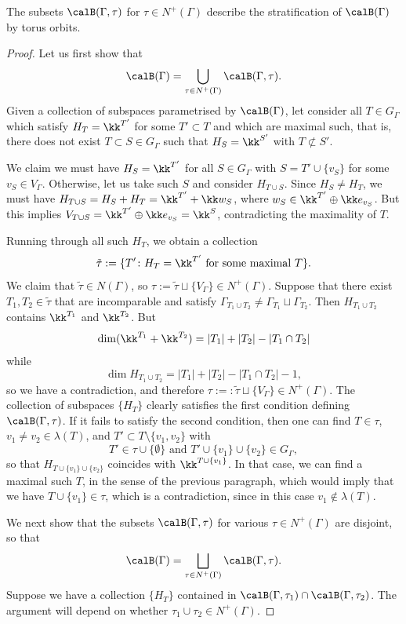 \begin{theorem}\label{th:orbits}
The subsets $\calB(\Gamma,\tau)$ for $\tau\in N^+(\Gamma)$ describe the stratification of $\calB(\Gamma)$ by torus orbits.
\end{theorem}

\begin{proof}
Let us first show that 
 \[
\calB(\Gamma)=\bigcup_{\tau\in N^+(\Gamma)} \calB(\Gamma,\tau).
 \]
Given a collection of subspaces parametrised by $\calB(\Gamma)$, let consider all $T\in G_\Gamma$ which satisfy $H_T=\kk^{T'}$ for some $T'\subset T$ and which are maximal such, that is, there does not exist $T\subset S\in G_\Gamma$ such that $H_S=\kk^{S'}$ with $T\not\subset S'$. 

We claim we must have $H_S=\kk^{T'}$ for all $S\in G_\Gamma$ with $S=T'\cup\{v_S\}$ for some $v_S\in V_\Gamma$. Otherwise, let us take such $S$ and consider $H_{T\cup S}$. Since $H_S\neq H_T$, we must have $H_{T\cup S}=H_S+H_T= \kk^{T'}+\kk w_S$, where $w_S\in \kk^{T'}\oplus \kk e_{v_S}$. But this implies $V_{T\cup S}=\kk^{T'}\oplus \kk e_{v_S}=\kk^{S}$, contradicting the maximality of $T$.

Running through all such $H_T$, we obtain a collection
 \[
\tilde\tau:=\{T'\colon H_T=\kk^{T'} \text{ for  some maximal } T\}.
 \]
We claim that $\tilde\tau\in N(\Gamma)$, so $\tau:=\tilde\tau\sqcup\{V_\Gamma\}\in N^+(\Gamma)$. Suppose that there exist $T_1,T_2\in\tilde\tau$ that are incomparable and satisfy $\Gamma_{T_1\cup T_2}\ne\Gamma_{T_1}\sqcup\Gamma_{T_2}$. Then $H_{T_1\cup T_2}$ contains $\kk^{T_1}$ and $\kk^{T_2}$. But 
 \[ 
\dim (\kk^{T_1}+\kk^{T_2}) = |T_1|+|T_2|-|T_1\cap T_2|
 \]
while
 \[
\dim H_{T_1\cup T_2} = |T_1|+|T_2|-|T_1\cap T_2|-1,
 \]
so we have a contradiction, and therefore $\tau:=:\tilde\tau\sqcup\{V_\Gamma\}\in N^+(\Gamma)$. The collection of subspaces $\{H_T\}$ clearly satisfies the first condition defining $\calB(\Gamma,\tau)$. If it fails to satisfy the second condition, then 
one can find $T\in\tau$, $v_1\ne v_2\in \lambda(T)$, and $T'\subset T\setminus\{v_1,v_2\}$ with 
 \[
T'\in \tau\cup\{\emptyset\}\text{  and } T'\cup\{v_1\}\cup\{v_2\}\in G_\Gamma,
 \] 
so that $H_{T\cup\{v_1\}\cup\{v_2\}}$ coincides with $\kk^{T\cup\{v_1\}}$. In that case, we can find a maximal such $T$, in the sense of the previous paragraph, which would imply that we have $T\cup\{v_1\}\in \tau$, which is a contradiction, since in this case $v_1\notin \lambda(T)$. 

We next show that the subsets $\calB(\Gamma,\tau)$ for various $\tau\in N^+(\Gamma)$ are disjoint, so that
 \[
\calB(\Gamma)=\bigsqcup_{\tau\in N^+(\Gamma)} \calB(\Gamma,\tau).
 \] 
Suppose we have a collection $\{H_T\}$ contained in $\calB(\Gamma,\tau_1)\cap \calB(\Gamma,\tau_2)$. The argument will depend on whether $\tau_1\cup \tau_2\in N^+(\Gamma)$.


\end{proof}
